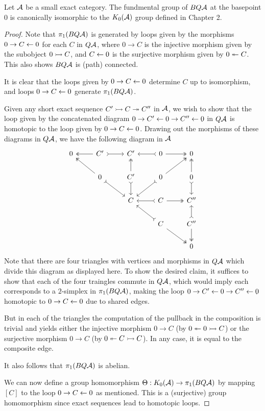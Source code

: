 \begin{theorem}[Quillen]
Let $\mathcal{A}$ be a small exact category.
The fundmental group of $BQ\mathcal{A}$ at the basepoint $0$ is canonically isomorphic to
the $K_0(\mathcal{A})$ group defined in Chapter 2.
\end{theorem}
\begin{proof}
Note that $\pi_1(BQ\mathcal{A})$ is generated by loops given by the morphisms $0 \to C \leftarrow 0$
for each $C$ in $Q\mathcal{A}$, where $0 \to C$ is the injective morphism given by the subobject $0 \rightarrowtail C$,
and $C \leftarrow 0$ is the surjective morphism given by $0 \twoheadleftarrow C$.
This also shows $BQ\mathcal{A}$ is (path) connected.

It is clear that the loops given by $0 \to C \leftarrow 0$ determine $C$ up to isomorphism,
and loops $0 \to C \leftarrow 0$ generate $\pi_1(BQ\mathcal{A})$.

Given any short exact sequence $C' \rightarrowtail C \twoheadrightarrow C''$ in $\mathcal{A}$, we wish to show that the loop given by
the concatenated diagram $0 \to C' \leftarrow 0 \to C'' \leftarrow 0$ in $Q\mathcal{A}$ is homotopic to the loop given by $0 \to C \leftarrow 0$.
Drawing out the morphisms of these diagrams in $Q\mathcal{A}$, we have the following diagram in $\mathcal{A}$
\[
\begin{tikzcd}
0 & C' \arrow[l, two heads] \arrow[r, tail] & C' & 0 \arrow[r, two heads] \arrow[l, tail] & 0 \\
  & 0  \arrow[ul,two heads] \arrow[dr,tail] & C'\arrow[u,two heads] \arrow[d,tail] & 0  \arrow[dl, tail] \arrow[ur,two heads]  & 0 \arrow[u, two heads] \arrow[d, tail]\\
  &             & C          & C \arrow[l, tail] \arrow[r, two heads] & C'' \\
  &             &            & C \arrow[ul, tail] \arrow[dr,two heads] & C''  \arrow[u, tail] \arrow[d, two heads]\\
  &             &            &    & 0
\end{tikzcd}
\]
Note that there are four triangles with vertices and morphisms in $Q\mathcal{A}$ which divide this diagram as displayed here.
To show the desired claim, it suffices to show that each of the four traingles commute in $Q\mathcal{A}$,
which would imply each corresponds to a $2$-simplex in $\pi_1(BQ\mathcal{A})$, making the loop
$0 \to C' \leftarrow 0 \to C'' \leftarrow 0$ homotopic to $0 \to C \leftarrow 0$ due to shared edges.

But in each of the triangles the computation of the pullback in the composition is trivial
and yields either the injective morphism $0 \to C$ (by $0 \twoheadleftarrow 0 \rightarrowtail C$) or the surjective morphism $0 \to C$ (by $0 \twoheadleftarrow C \rightarrowtail C$).
In any case, it is equal to the composite edge.

It also follows that $\pi_1(BQ\mathcal{A})$ is abelian.

We can now define a group homomorphism $\Theta : K_0(\mathcal{A}) \to \pi_1(BQ\mathcal{A})$ by
mapping $[C]$ to the loop $0 \to C \leftarrow 0$ as mentioned. This is a (surjective) group homomorphism
since exact sequences lead to homotopic loops.

\end{proof}

